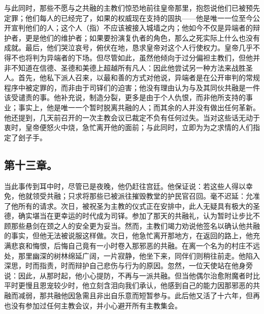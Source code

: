 与此同时，那些不愿与之共融的主教们惊恐地前往皇帝那里，抱怨说他们已被预先定罪；他们每人的已经完了，如果的权威现在支持的固执——他是唯一一位至今公开宣判他们的人；这个人（指）不应该被接入城墙之内；他如今不仅是异端者的辩护者，更是他们的维护者；如果要扮演复仇者的角色，那么之死实际上什么也没有成就。最后，他们哭泣哀号，俯伏在地，恳求皇帝对这个人行使权力。皇帝几乎不得不也将判为异端者的下场。但尽管如此，虽然他倾向于过分偏袒主教们，但他并非不知道在信德、圣德和美德上超越所有凡人：因此他尝试另一种方法来战胜圣人。首先，他私下派人召来，以最和善的方式对他说，异端者是在公开审判的常规程序中被定罪的，而非由于司铎们的迫害；他没有理由认为与及其同伙共融是一件该受谴责的事。他补充说，制造分裂，更多是由于个人仇恨，而非他所支持的事业；事实上，他是唯一一个暂时脱离共融的人；而其余的人并没有做出任何革新。他还提到，几天前召开的一次主教会议已裁定不负有任何过失。当对这些话无动于衷时，皇帝便怒火中烧，急忙离开他的面前；与此同时，立即为为之求情的人们指定了刽子手。\par


\subsection{第十三章。}

当此事传到耳中时，尽管已是夜晚，他仍赶往宫廷。他保证说：若这些人得以幸免，他就领受共融；只求将那些已被派往摧毁教堂的护民官召回。毫不迟延：允准了他所有的请求。次日，被祝圣为主教的仪式正在安排中，此人无疑具有极大的圣德，确实堪当在更幸运的时代成为司铎。参加了那天的共融礼，认为暂时让步比不顾那些悬剑在颈之人的安全更为妥当。然而，主教们竭力劝说他签名以确认他共融的事实，但他无法被说服这样做。次日，他急忙离开那地方，在返回的路上，他充满悲哀和悔恨，后悔自己竟有一小时卷入那邪恶的共融。在离一个名为的村庄不远处，那里幽深的树林绵延广阔，一片寂静，他坐下来，同伴们则稍往前走。他陷入深思，时而指责，时而辩护自己悲伤与行为的原因。忽然，一位天使站在他身旁说：因此，从那时起，他小心提防，不再与一派共融。但当他偶尔治愈附魔者时比平时更慢且恩宠较少时，他立刻含泪向我们承认，他感到自己的能力因那邪恶的共融而减弱，那共融他因急需且非出自乐意而短暂参与。此后他又活了十六年，但再也没有参加过任何主教会议，并小心避开所有主教集会。\par

